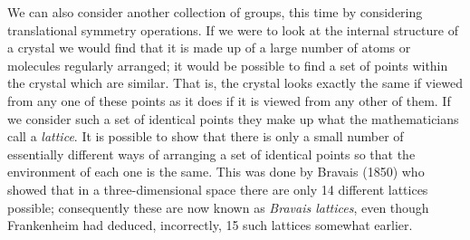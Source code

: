 \documentclass[11pt,a4paper,twoside,openright]{book}
\begin{document}
We can also consider another collection of groups, this time by considering translational symmetry operations. If we were to look at the internal structure of a crystal we would find that it is made up of a large number of atoms or molecules regularly arranged; it would be possible to find a set of points within the crystal which are similar. That is, the crystal looks exactly the same if viewed from any one of these points as it does if it is viewed from any other of them. If we consider such a set of identical points they make up what the mathematicians call a \textit{lattice}. It is possible to show that there is only a small number of essentially different ways of arranging a set of identical points so that the environment of each one is the same. This was done by Bravais (1850) who showed that in a three-dimensional space there are only 14 different lattices possible; consequently these are now known as \textit{Bravais lattices}, even though Frankenheim had deduced, incorrectly, 15 such lattices somewhat earlier.
\end{document}
